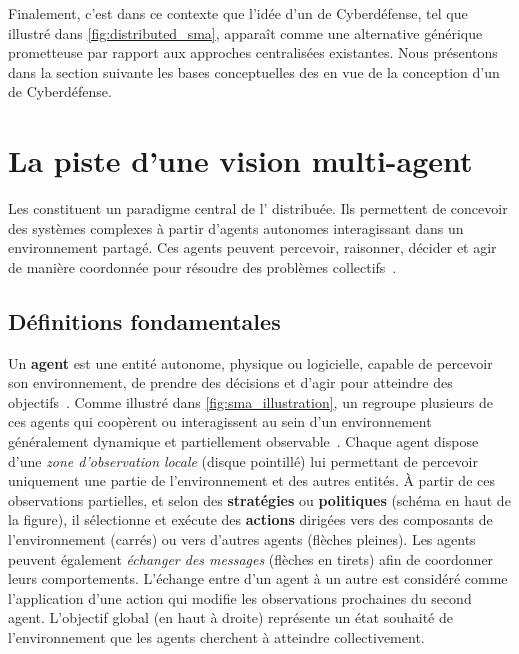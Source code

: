 \noindent
Finalement, c'est dans ce contexte que l'idée d'un  de Cyberdéfense, tel que illustré dans \autoref{fig:distributed_sma}, apparaît comme une alternative générique prometteuse par rapport aux approches centralisées existantes. Nous présentons dans la section suivante les bases conceptuelles des  en vue de la conception d'un  de Cyberdéfense.

\section{La piste d'une vision multi-agent}\label{sec:sma-concepts}

Les  constituent un paradigme central de l' distribuée. Ils permettent de concevoir des systèmes complexes à partir d'agents autonomes interagissant dans un environnement partagé. Ces agents peuvent percevoir, raisonner, décider et agir de manière coordonnée pour résoudre des problèmes collectifs~\cite{Ferber1999,Wooldridge2002}.

\subsection*{Définitions fondamentales}

Un \textbf{agent} est une entité autonome, physique ou logicielle, capable de percevoir son environnement, de prendre des décisions et d'agir pour atteindre des objectifs~\cite{Russell2010}. Comme illustré dans \autoref{fig:sma_illustration}, un  regroupe plusieurs de ces agents qui coopèrent ou interagissent au sein d'un environnement généralement dynamique et partiellement observable~\cite{Jennings1998,Shoham2007}. Chaque agent dispose d'une \emph{zone d'observation locale} (disque pointillé) lui permettant de percevoir uniquement une partie de l'environnement et des autres entités. À partir de ces observations partielles, et selon des \textbf{stratégies} ou \textbf{politiques} (schéma en haut de la figure), il sélectionne et exécute des \textbf{actions} dirigées vers des composants de l'environnement (carrés) ou vers d'autres agents (flèches pleines). Les agents peuvent également \emph{échanger des messages} (flèches en tirets) afin de coordonner leurs comportements. L'échange entre d'un agent à un autre est considéré comme l'application d'une action qui modifie les observations prochaines du second agent. L'objectif global (en haut à droite) représente un état souhaité de l'environnement que les agents cherchent à atteindre collectivement.

